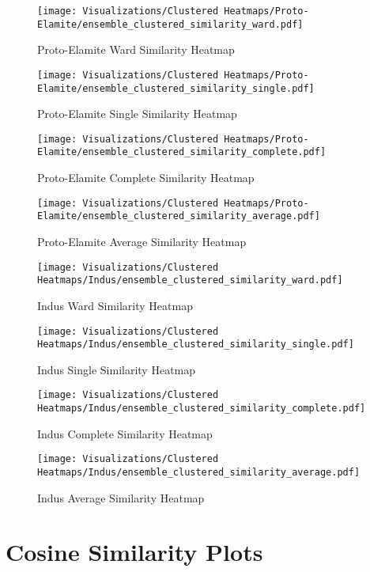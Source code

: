 \documentclass[11pt,a4paper,oneside]{report}
\begin{document}
\begin{figure}[H]
    \centering
    \texttt{[image: Visualizations/Clustered Heatmaps/Proto-Elamite/ensemble\_clustered\_similarity\_ward.pdf]}
     \caption*{Proto-Elamite Ward Similarity Heatmap}
\end{figure}
 \begin{figure}[H]
    \centering
    \texttt{[image: Visualizations/Clustered Heatmaps/Proto-Elamite/ensemble\_clustered\_similarity\_single.pdf]}
     \caption*{Proto-Elamite Single Similarity Heatmap}
\end{figure}
\begin{figure}[H]
    \centering
    \texttt{[image: Visualizations/Clustered Heatmaps/Proto-Elamite/ensemble\_clustered\_similarity\_complete.pdf]}
     \caption*{Proto-Elamite Complete Similarity Heatmap}
\end{figure}
\begin{figure}[H]
    \centering
    \texttt{[image: Visualizations/Clustered Heatmaps/Proto-Elamite/ensemble\_clustered\_similarity\_average.pdf]}
     \caption*{Proto-Elamite Average Similarity Heatmap}
\end{figure}

 \begin{figure}[H]
    \centering
    \texttt{[image: Visualizations/Clustered Heatmaps/Indus/ensemble\_clustered\_similarity\_ward.pdf]}
     \caption*{Indus Ward Similarity Heatmap}
\end{figure}
 \begin{figure}[H]
    \centering
    \texttt{[image: Visualizations/Clustered Heatmaps/Indus/ensemble\_clustered\_similarity\_single.pdf]}
     \caption*{Indus Single Similarity Heatmap}
\end{figure}
 \begin{figure}[H]
    \centering
    \texttt{[image: Visualizations/Clustered Heatmaps/Indus/ensemble\_clustered\_similarity\_complete.pdf]}
     \caption*{Indus Complete Similarity Heatmap}
\end{figure}
 \begin{figure}[H]
    \centering
    \texttt{[image: Visualizations/Clustered Heatmaps/Indus/ensemble\_clustered\_similarity\_average.pdf]}
     \caption*{Indus Average Similarity Heatmap}
\end{figure}

\section{Cosine Similarity Plots}
\label{app: similarity}
\end{document}
